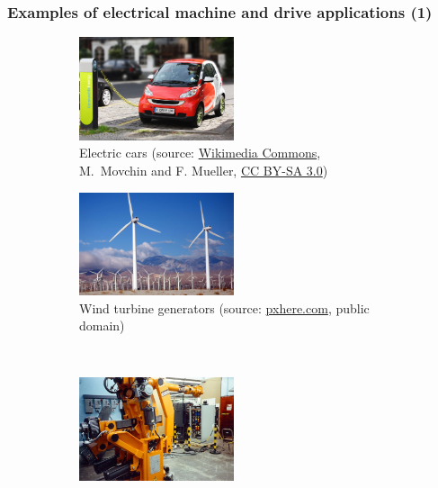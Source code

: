 \begin{frame}
	\frametitle{Examples of electrical machine and drive applications (1)}
	\begin{figure}
		\centering
		\begin{subfigure}[b]{0.49\textwidth}
			\centering
			\includegraphics[width=0.5\textwidth]{fig/lec01/Electric_Car_recharging.jpg}
			\caption{Electric cars (source: \href{https://commons.wikimedia.org/wiki/File:Electric_Car_recharging.jpg}{Wikimedia Commons}, M.~Movchin and F. Mueller, \href{https://creativecommons.org/licenses/by-sa/3.0/deed.en}{CC BY-SA 3.0})}
		\end{subfigure}
		\hfill
		\begin{subfigure}[b]{0.49\textwidth}
			\centering
			\includegraphics[width=0.5\textwidth]{fig/lec01/sky-farm-windmill.jpg}
			\caption{Wind turbine generators (source: \href{https://pxhere.com/en/photo/954757}{pxhere.com}, public domain)}
		\end{subfigure}
		\\
		\begin{subfigure}[b]{0.49\textwidth}
			\centering
			\includegraphics[width=0.5\textwidth]{fig/lec01/Automatix_KukaRobot.jpg}

\end{subfigure}
\end{figure}
\end{frame}
